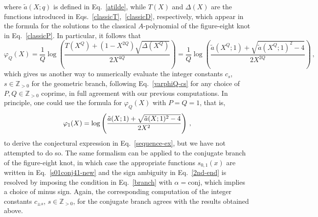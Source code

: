 \documentclass[a4paper,11pt]{article}
\theoremstyle{definition}
\def\IZ{{\mathbb Z}}
\newcommand{\be}{\begin{equation}}
\newcommand{\ee}{\end{equation}}
\begin{document}
where $\tilde{a}(X; q)$ is defined in Eq.~\eqref{atilde}, while $T(X)$ and $\Delta(X)$ are the functions introduced in Eqs.~\eqref{classicT},~\eqref{classicD}, respectively, which appear in the formula for the solutions to the classical $A$-polynomial of the figure-eight knot in Eq.~\eqref{classicP}.
In particular, it follows that
\be \label{8varphiQ}
\varphi_Q(X)= \frac{1}{Q} \log \left(\frac{T(X^Q) + (1-X^{2 Q})\sqrt{\Delta(X^Q)}}{2 X^{4 Q}} \right) = \frac{1}{Q} \log \left(\frac{\tilde{a}(X^Q; 1) + \sqrt{\tilde{a}(X^Q; 1)^2-4}}{2 X^{2 Q}} \right) \, ,
\ee
which gives us another way to numerically evaluate the integer constants $c_s$, $s \in \IZ_{>0}$ for the geometric branch, following Eq.~\eqref{varphiQ-cs} for any choice of $P, Q \in \IZ_{>0}$ coprime, in full agreement with our previous computations. In principle, one could use the formula for $\varphi_Q(X)$ with $P=Q=1$, that is, 
\be
\label{8varphi1}
\varphi_1(X)= \log \left( {\tilde{a}(X;1) + {\sqrt{\tilde{a}(X;1)^2- 4}} \over 2 X^2} \right) \, ,
\ee
to derive the conjectural expression in Eq.~\eqref{sequence-ex}, but we have not attempted to do so. The same formalism can be applied to the conjugate branch of the figure-eight knot, in which case the appropriate functions $s_{0,1}(x)$ are written in Eq.~\eqref{s01conj41-new} and the sign ambiguity in Eq.~\eqref{2nd-end} is resolved by imposing the condition in Eq.~\eqref{branch} with $\alpha = \text{conj}$, which implies a choice of minus sign. Again, the corresponding computation of the integer constants $c_{\pm s}$, $s \in \IZ_{>0}$, for the conjugate branch agrees with the results obtained above.
\end{document}
